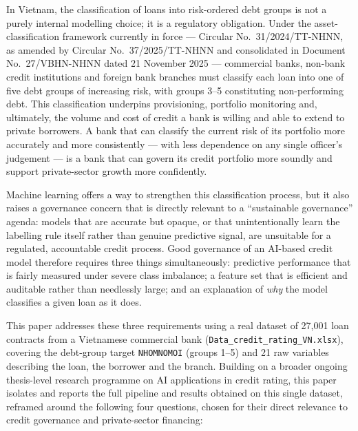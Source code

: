 \documentclass[11pt,a4paper]{article}
\begin{document}
In Vietnam, the classification of loans into risk-ordered debt groups is not a purely internal modelling choice; it is a regulatory obligation. Under the asset-classification framework currently in force --- Circular No.\ 31/2024/TT-NHNN, as amended by Circular No.\ 37/2025/TT-NHNN and consolidated in Document No.\ 27/VBHN-NHNN dated 21 November 2025 --- commercial banks, non-bank credit institutions and foreign bank branches must classify each loan into one of five debt groups of increasing risk, with groups 3--5 constituting non-performing debt. This classification underpins provisioning, portfolio monitoring and, ultimately, the volume and cost of credit a bank is willing and able to extend to private borrowers. A bank that can classify the current risk of its portfolio more accurately and more consistently --- with less dependence on any single officer's judgement --- is a bank that can govern its credit portfolio more soundly and support private-sector growth more confidently.

Machine learning offers a way to strengthen this classification process, but it also raises a governance concern that is directly relevant to a ``sustainable governance'' agenda: models that are accurate but opaque, or that unintentionally learn the labelling rule itself rather than genuine predictive signal, are unsuitable for a regulated, accountable credit process. Good governance of an AI-based credit model therefore requires three things simultaneously: predictive performance that is fairly measured under severe class imbalance; a feature set that is efficient and auditable rather than needlessly large; and an explanation of \textit{why} the model classifies a given loan as it does.

This paper addresses these three requirements using a real dataset of 27{,}001 loan contracts from a Vietnamese commercial bank (\texttt{Data\_credit\_rating\_VN.xlsx}), covering the debt-group target \texttt{NHOMNOMOI} (groups 1--5) and 21 raw variables describing the loan, the borrower and the branch. Building on a broader ongoing thesis-level research programme on AI applications in credit rating, this paper isolates and reports the full pipeline and results obtained on this single dataset, reframed around the following four questions, chosen for their direct relevance to credit governance and private-sector financing:
\end{document}

